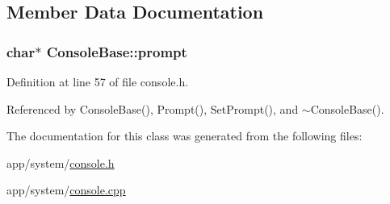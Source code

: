 \subsection{Member Data Documentation}
\subsubsection[{\texorpdfstring{prompt}{prompt}}]{\setlength{\rightskip}{0pt plus 5cm}char$\ast$ Console\+Base\+::prompt\hspace{0.3cm}{\ttfamily [private]}}\hypertarget{classConsoleBase_ac0b5764a1c339ac271d0c44943e4370c}{}\label{classConsoleBase_ac0b5764a1c339ac271d0c44943e4370c}


Definition at line 57 of file console.\+h.



Referenced by Console\+Base(), Prompt(), Set\+Prompt(), and $\sim$\+Console\+Base().



The documentation for this class was generated from the following files\+:\begin{DoxyCompactItemize}
\item 
app/system/\hyperlink{console_8h}{console.\+h}\item 
app/system/\hyperlink{console_8cpp}{console.\+cpp}\end{DoxyCompactItemize}
